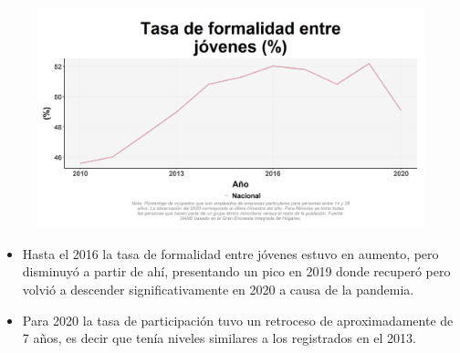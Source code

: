    \begin{figure}[H]
        \caption[Tasa de formalidad entre jóvenes a nivel nacional ]{\label{formaljov_nal_trend} }
        \begin{center}
        \includegraphics[width=\textwidth,keepaspectratio]{img/var_66_trend.png}
        \end{center}
    \end{figure}
            \begin{itemize}
                \item Hasta el 2016 la tasa de formalidad entre jóvenes estuvo en aumento, pero disminuyó a partir de ahí, presentando un pico en 2019 donde recuperó pero volvió a descender significativamente en 2020 a causa de la pandemia.
                \item Para 2020 la tasa de participación tuvo un retroceso de aproximadamente de 7 años, es decir que tenía niveles similares a los registrados en el 2013.
                \end{itemize}

